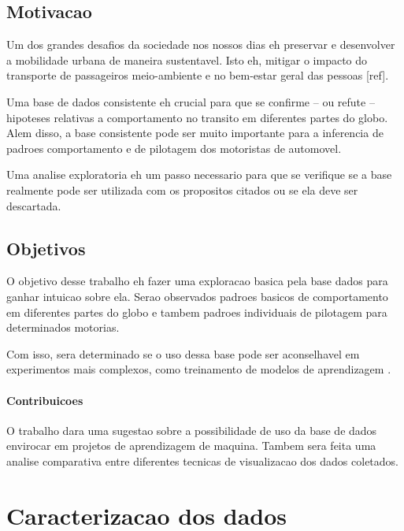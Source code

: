 \documentclass[10pt, conference]{IEEEtran}
\begin{document}
\subsection{Motivacao}
%

Um dos grandes desafios da sociedade nos nossos dias eh preservar
e desenvolver a mobilidade urbana de maneira sustentavel. Isto eh,
mitigar o impacto do transporte de passageiros meio-ambiente e no
bem-estar geral das pessoas [ref].

Uma base de dados consistente eh crucial para que se confirme
-- ou refute -- hipoteses relativas a comportamento no transito
em diferentes partes do globo. Alem disso, a base consistente
pode ser muito importante para a inferencia de padroes comportamento 
e de pilotagem dos motoristas de automovel. 

Uma analise exploratoria eh um passo necessario para que se verifique
se a base realmente pode ser utilizada com os propositos citados 
ou se ela deve ser descartada.


\subsection{Objetivos}
%
O objetivo desse trabalho eh fazer uma exploracao basica pela base dados
para ganhar intuicao sobre ela.  Serao observados padroes basicos de 
comportamento em diferentes partes do globo e tambem padroes individuais
de pilotagem para determinados motorias.

Com isso, sera determinado se o uso dessa base pode ser aconselhavel
em experimentos mais complexos, como 
treinamento de modelos de aprendizagem . 

\paragraph*{Contribuicoes}
%
O trabalho dara uma sugestao sobre a possibilidade de uso da base de dados
envirocar em projetos de aprendizagem de maquina. Tambem sera feita uma
analise comparativa entre diferentes tecnicas de visualizacao dos dados
coletados.


\section{Caracterizacao dos dados}
%
\end{document}
